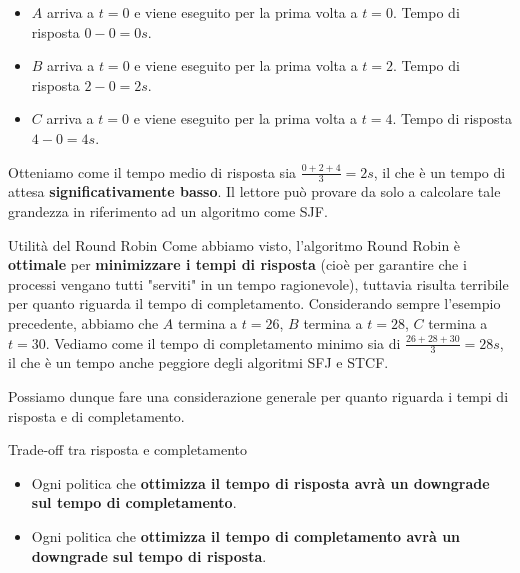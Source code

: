 \documentclass[12pt]{report}
\begin{document}
	\begin{itemize}
		\item $A$ arriva a $t = 0$ e viene eseguito per la prima volta a $t = 0$. Tempo di risposta $0-0=0s$.
		
		\item $B$ arriva a $t = 0$ e viene eseguito per la prima volta a $t = 2$. Tempo di risposta $2-0=2s$.
		
		\item $C$ arriva a $t = 0$ e viene eseguito per la prima volta a $t = 4$. Tempo di risposta $4-0=4s$.
	\end{itemize}
	Otteniamo come il tempo medio di risposta sia $\frac{0+2+4}{3} = 2s$, il che è un tempo di attesa \textbf{significativamente basso}. Il lettore può provare da solo a calcolare tale grandezza in riferimento ad un algoritmo come SJF.
	
	\begin{osservazione}{Utilità del Round Robin}{}
		Come abbiamo visto, l'algoritmo Round Robin è \textbf{ottimale} per \textbf{minimizzare i tempi di risposta} (cioè per garantire che i processi vengano tutti "serviti" in un tempo ragionevole), tuttavia risulta terribile per quanto riguarda il tempo di completamento.
		\smallbreak
		Considerando sempre l'esempio precedente, abbiamo che $A$ termina a $t=26$, $B$ termina a $t=28$, $C$ termina a $t=30$. Vediamo come il tempo di completamento minimo sia di $\frac{26+28+30}{3} = 28s$, il che è un tempo anche peggiore degli algoritmi SFJ e STCF.
	\end{osservazione}
	
	Possiamo dunque fare una considerazione generale per quanto riguarda i tempi di risposta e di completamento.
	\begin{osservazione}{Trade-off tra risposta e completamento}{}
		\begin{itemize}
			\item Ogni politica che \textbf{ottimizza il tempo di risposta avrà un downgrade sul tempo di completamento}.
			
			\item Ogni politica che \textbf{ottimizza il tempo di completamento avrà un downgrade sul tempo di risposta}.
		\end{itemize}
	\end{osservazione}
	
\end{document}
